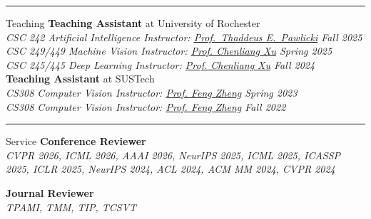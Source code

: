 \vspace{10pt}
\hrule
\begin{rSection}{Teaching}
    \textbf{Teaching Assistant} at University of Rochester \\
    \textit{CSC 242 Artificial Intelligence \quad Instructor: \href{https://www.cs.rochester.edu/u/pawlicki/}{Prof.~Thaddeus E.~Pawlicki} \hfill Fall 2025}\\
    \textit{CSC 249/449 Machine Vision \quad Instructor: \href{https://www.cs.rochester.edu/~cxu22/index.html}{Prof. Chenliang Xu}  \hfill Spring 2025}\\
    \textit{CSC 245/445 Deep Learning \quad Instructor: \href{https://www.cs.rochester.edu/~cxu22/index.html}{Prof. Chenliang Xu}  \hfill Fall 2024}\\[5pt]
    \textbf{Teaching Assistant} at SUSTech \\
    \textit{CS308 Computer Vision \quad Instructor: \href{https://scholar.google.com/citations?user=PcmyXHMAAAAJ}{Prof. Feng Zheng} \hfill Spring 2023} \\
    \textit{CS308 Computer Vision \quad Instructor: \href{https://scholar.google.com/citations?user=PcmyXHMAAAAJ}{Prof. Feng Zheng} \hfill Fall 2022}
\end{rSection}
\vspace{10pt}
\hrule
\begin{rSection}{Service}
\textbf{Conference Reviewer}\\
    \textit{CVPR 2026, ICML 2026, AAAI 2026, NeurIPS 2025, ICML 2025, ICASSP 2025, ICLR 2025, NeurIPS 2024, ACL 2024, ACM MM 2024, CVPR 2024}

    \textbf{Journal Reviewer}\\
    \textit{TPAMI, TMM, TIP, TCSVT}

\end{rSection}
